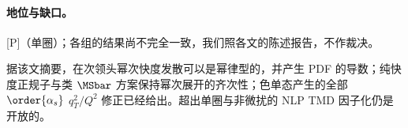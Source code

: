 \paragraph{地位与缺口。}[P]（单圈）；各组的结果尚不完全一致，我们照各文的陈述报告，不作裁决。

\begin{remark}[次领头幂次的幂律快度发散]\label{rem:front-power-rapidity}
据该文摘要\cite{Ebert:2018gsn}，在次领头幂次快度发散可以是幂律型的，并产生 PDF 的导数；纯快度正规子与类 $\MSbar$ 方案保持幂次展开的齐次性；色单态产生的全部 $\order{\alpha_s}$ $q_T^2/Q^2$ 修正已经给出。超出单圈与非微扰的 NLP TMD 因子化仍是开放的。
\end{remark}
